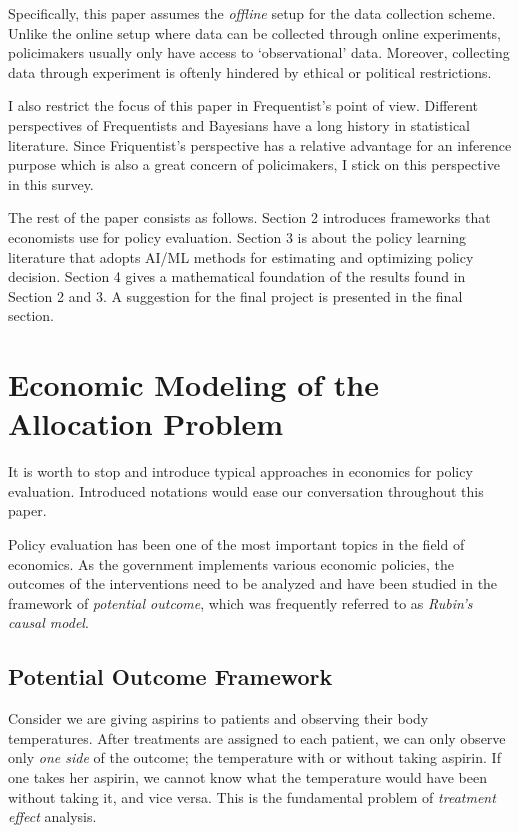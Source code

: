 \documentclass[11pt]{article}
\begin{document}
	Specifically, this paper assumes the \textit{offline} setup for the data collection scheme. Unlike the online setup where data can be collected through online experiments, policimakers usually only have access to `observational' data. Moreover, collecting data through experiment is oftenly hindered by ethical or political restrictions.

	I also restrict the focus of this paper in Frequentist's point of view. Different perspectives of Frequentists and Bayesians have a long history in statistical literature. Since Friquentist's perspective has a relative advantage for an inference purpose which is also a great concern of policimakers, I stick on this perspective in this survey.
	
	The rest of the paper consists as follows. Section 2 introduces frameworks that economists use for policy evaluation. Section 3 is about the policy learning literature that adopts AI/ML methods for estimating and optimizing policy decision. Section 4 gives a mathematical foundation of the results found in Section 2 and 3. A suggestion for the final project is presented in the final section. 
	
	\section{Economic Modeling of the Allocation Problem}
	It is worth to stop and introduce typical approaches in economics for policy evaluation. Introduced notations would ease our conversation throughout this paper.
	
	Policy evaluation has been one of the most important topics in the field of economics.  As the government implements various economic policies, the outcomes of the interventions need to be analyzed and have been studied in the framework of \textit{potential outcome}, which was frequently referred to as \textit{Rubin's causal model}.
	
	\subsection*{Potential Outcome Framework}
	Consider we are giving aspirins to patients and observing their body temperatures. After treatments are assigned to each patient, we can only observe only \textit{one side} of the outcome; the temperature with or without taking aspirin. If one takes her aspirin, we cannot know what the temperature would have been without taking it, and vice versa. This is the fundamental problem of \textit{treatment effect} analysis.
	
\end{document}
